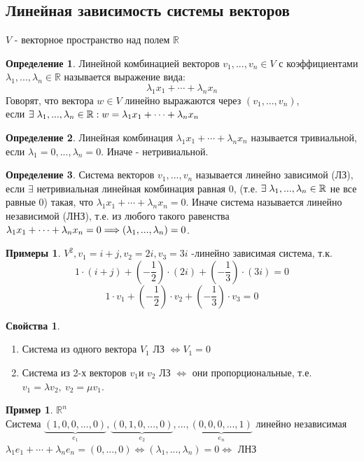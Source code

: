 \documentclass[a4paper, 12pt]{article}
\newcommand{\R}{\mathbb R}
\newcommand\tab[1][.5cm]{\hspace*{#1}}
\theoremstyle{definition}
\newtheorem*{definition}{Определение}
\newtheorem*{example}{Примеры}
\newtheorem*{example1}{Пример}
\newtheorem*{properties}{Свойства}
\begin{document}
  \subsection{Линейная зависимость системы векторов}
  $V$ - векторное пространство над полем $\R$
  \begin{definition}
    Линейной комбинацией векторов $v_1,...,v_n \in V$ с коэффициентами $\lambda_1,...,\lambda_n \in \R$ называется выражение вида: 
    $$\lambda_1 x_1 + \cdots + \lambda_n x_n$$ 
    Говорят, что вектора $w \in V$ линейно выражаются через $(v_1,...,v_n)$, \\ если $\exists\tab[0.1cm]\lambda_1,...,\lambda_n \in \R: w = \lambda_1 x_1 + \cdots + \lambda_n x_n$   
  \end{definition}
  \begin{definition}
    Линейная комбинация $\lambda_1 x_1 + \cdots + \lambda_n x_n$ называется тривиальной, если $\lambda_1 = 0,...,\lambda_n = 0$. Иначе - нетривиальной.
  \end{definition}
  \begin{definition}
    Система векторов $v_1,...,v_n$ называется линейно зависимой (ЛЗ), если $\exists$ нетривиальная линейная комбинация равная 0, (т.е. $\exists \tab[0.1cm]\lambda_1,...,\lambda_n \in \R$ не все равные 0) такая, что $\lambda_1 x_1 + \cdots + \lambda_n x_n = 0$. Иначе система называется линейно независимой (ЛНЗ), т.е. из любого такого равенства $\lambda_1 x_1 + \cdots + \lambda_n x_n = 0 \\ \Longrightarrow (\lambda_1,...,\lambda_n) = 0$.
  \end{definition}
  \begin{example}
    $V^2, v_1 = i + j, v_2 = 2i, v_3 = 3i$ -линейно зависимая система, т.к. $$1 \cdot (i + j) + (- \frac{1}{2}) \cdot (2i) + (-\frac{1}{3}) \cdot (3i) = 0$$ 
    $$1 \cdot v_1 + (-\frac{1}{2}) \cdot v_2 + (-\frac{1}{3}) \cdot v_3 = 0$$  
  \end{example}  
  \begin{properties} \end{properties} 
    \begin{enumerate}
      \item Система из одного вектора $V_1$ ЛЗ $\Longleftrightarrow V_1 = 0$  
      \item Система из 2-х векторов $v_1 \text{и } v_2$ ЛЗ $\Longleftrightarrow$ они пропорциональные, т.е. \\$v_1 = \lambda v_2, \  v_2 = \mu v_1$. 
    \end{enumerate}
  \begin{example1}
    $\R^n$ \\
    Система $\underbrace{(1,0,0,...,0)}_{e_1} , \underbrace{(0,1,0,...,0)}_{e_2},...,\underbrace{(0,0,0,...,1)}_{e_n}$ линейно независимая \\
    $\lambda_1 e_1 + \cdots + \lambda_n e_n = (0,...,0) \Longleftrightarrow (\lambda_1,...,\lambda_n) = 0 \Longleftrightarrow $ ЛНЗ 
  \end{example1}
\end{document}
